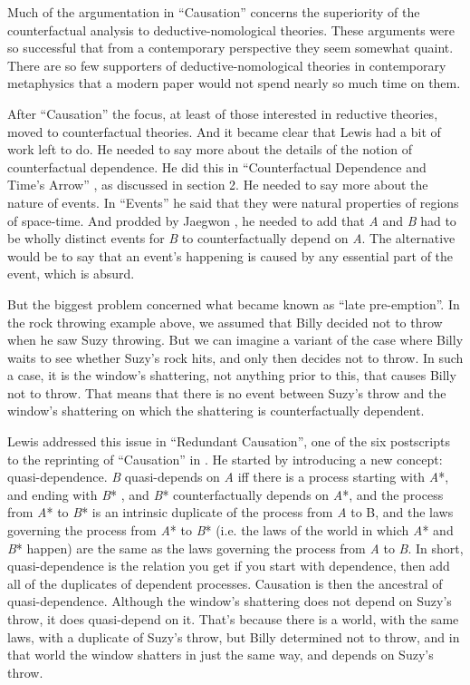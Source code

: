 Much of the argumentation in ``Causation'' concerns the superiority of the counterfactual analysis to deductive-nomological theories. These arguments were so successful that from a contemporary perspective they seem somewhat quaint. There are so few supporters of deductive-nomological theories in contemporary metaphysics that a modern paper would not spend nearly so much time on them.

After ``Causation'' the focus, at least of those interested in reductive theories, moved to counterfactual theories. And it became clear that Lewis had a bit of work left to do. He needed to say more about the details of the notion of counterfactual dependence. He did this in ``Counterfactual Dependence and Time's Arrow'' \citeyearpar{Lewis1979c}, as discussed in section 2. He needed to say more about the nature of events. In ``Events'' \citeyearpar{Lewis1986g} he said that they were natural properties of regions of space-time. And prodded by Jaegwon \citet{Kim1973}, he needed to add that \textit{A} and \textit{B} had to be wholly distinct events for \textit{B} to counterfactually depend on \textit{A}. The alternative would be to say that an event's happening is caused by any essential part of the event, which is absurd.

But the biggest problem concerned what became known as ``late pre-emption''. In the rock throwing example above, we assumed that Billy decided not to throw when he saw Suzy throwing. But we can imagine a variant of the case where Billy waits to see whether Suzy's rock hits, and only then decides not to throw. In such a case, it is the window's shattering, not anything prior to this, that causes Billy not to throw. That means that there is no event between Suzy's throw and the window's shattering on which the shattering is counterfactually dependent.

Lewis addressed this issue in ``Redundant Causation'', one of the six postscripts to the reprinting of ``Causation'' in \citeyearpar{Lewis1986b}. He started by introducing a new concept: quasi-dependence. \textit{B} quasi-depends on \textit{A} iff there is a process starting with \textit{A}*, and ending with \textit{B}* , and \textit{B}* counterfactually depends on \textit{A}*, and the process from \textit{A}* to \textit{B}* is an intrinsic duplicate of the process from \textit{A} to B, and the laws governing the process from \textit{A}* to \textit{B}* (i.e. the laws of the world in which \textit{A}* and \textit{B}* happen) are the same as the laws governing the process from \textit{A} to \textit{B}. In short, quasi-dependence is the relation you get if you start with dependence, then add all of the duplicates of dependent processes. Causation is then the ancestral of quasi-dependence. Although the window's shattering does not depend on Suzy's throw, it does quasi-depend on it. That's because there is a world, with the same laws, with a duplicate of Suzy's throw, but Billy determined not to throw, and in that world the window shatters in just the same way, and depends on Suzy's throw.

